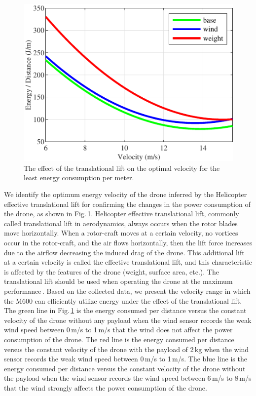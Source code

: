 \documentclass[journal]{./template/IEEEtran}
\begin{document}
\begin{figure}[ht]
\centering\includegraphics[scale=1.0]{fig10/t_lift.pdf}
\caption{The effect of the translational lift on the optimal velocity for the least energy consumption per meter.}
\label{fig: lift}
\end{figure}

We identify the optimum energy velocity of the drone inferred by the Helicopter effective translational lift for confirming the changes in the power consumption of the drone, as shown in Fig.\,\ref{fig: lift}.
Helicopter effective translational lift, commonly called translational lift in aerodynamics, always occurs when the rotor blades move horizontally. 
When a rotor-craft moves at a certain velocity, no vortices occur in the rotor-craft, and the air flows horizontally, then the lift force increases due to the airflow decreasing the induced drag of the drone. 
This additional lift at a certain velocity is called the effective translational lift, and this characteristic is affected by the features of the drone (weight, surface area, etc.). 
The translational lift should be used when operating the drone at the maximum performance\,\cite{ref_20}.
Based on the collected data, we present the velocity range in which the M600 can efficiently utilize energy under the effect of the translational lift. 
The green line in Fig.\,\ref{fig: lift} is the energy consumed per distance versus the constant velocity of the drone without any payload when the wind sensor records the weak wind speed between 0\,m/s to 1\,m/s that the wind does not affect the power consumption of the drone.
The red line is the energy consumed per distance versus the constant velocity of the drone with the payload of 2\,kg when the wind sensor records the weak wind speed between 0\,m/s to 1\,m/s.
The blue line is the energy consumed per distance versus the constant velocity of the drone without the payload when the wind sensor records the wind speed between 6\,m/s to 8\,m/s that the wind strongly affects the power consumption of the drone.
\end{document}
